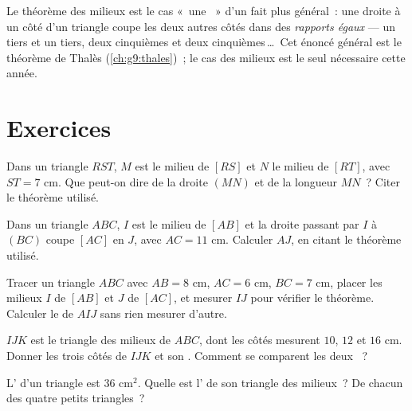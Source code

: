 \begin{remark}
Le théorème des milieux est le cas «~une ~» d'un fait plus
général~: une droite  à un côté d'un triangle coupe les deux
autres côtés dans des \emph{rapports égaux} --- un tiers et un tiers,
deux cinquièmes et deux cinquièmes\,\dots\ Cet énoncé général est le
théorème de Thalès (\cref{ch:g9:thales})~; le cas des milieux est le
seul nécessaire cette année.
\end{remark}

\section{Exercices}

\begin{exercise}[$\star$]\label{exo:g8:midpoints:1}
Dans un triangle $RST$, $M$ est le milieu de $[RS]$ et $N$ le milieu
de $[RT]$, avec $ST = 7$ cm. Que peut-on dire de la droite $(MN)$ et
de la longueur $MN$~? Citer le théorème utilisé.
\end{exercise}

\begin{exercise}[$\star$]\label{exo:g8:midpoints:2}
Dans un triangle $ABC$, $I$ est le milieu de $[AB]$ et la droite
passant par $I$  à $(BC)$ coupe $[AC]$ en $J$, avec
$AC = 11$ cm. Calculer $AJ$, en citant le théorème utilisé.
\end{exercise}

\begin{exercise}[$\star$]\label{exo:g8:midpoints:3}
Tracer un triangle $ABC$ avec $AB = 8$ cm, $AC = 6$ cm, $BC = 7$ cm,
placer les milieux $I$ de $[AB]$ et $J$ de $[AC]$, et mesurer $IJ$
pour vérifier le théorème. Calculer le  de $AIJ$ sans rien
mesurer d'autre.
\end{exercise}

\begin{exercise}[$\star$]\label{exo:g8:midpoints:4}
$IJK$ est le triangle des milieux de $ABC$, dont les côtés mesurent
$10$, $12$ et $16$ cm. Donner les trois côtés de $IJK$ et son
. Comment se comparent les deux ~?
\end{exercise}

\begin{exercise}[$\star$]\label{exo:g8:midpoints:5}
L' d'un triangle est $36$ cm$^2$. Quelle est l' de son
triangle des milieux~? De chacun des quatre petits triangles~?
\end{exercise}

